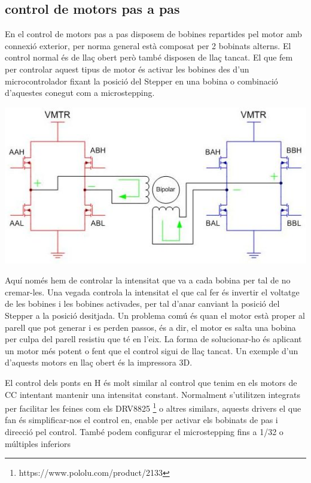 \subsection{control de motors pas a pas }

En el control de motors pas a pas disposem de bobines repartides pel motor amb connexió exterior, per norma general està composat per 2 bobinats alterns. El control normal és de llaç obert però també disposen de llaç tancat. El que fem per controlar aquest tipus de motor és activar les bobines des d'un microcontrolador fixant la posició del Stepper en una bobina o combinació d'aquestes conegut com a microstepping.

\includegraphics[width=\textwidth]{Motors/stepers.jpg}

Aquí només hem de controlar la intensitat que va a cada bobina per tal de no cremar-les. Una vegada controla la intensitat el que cal fer és invertir el voltatge de les bobines i les bobines activades, per tal d'anar canviant la posició del Stepper a la posició desitjada. Un problema comú és quan el motor està proper al parell que pot generar i es perden passos, és a dir, el motor es salta una bobina per culpa del parell resistiu que té en l'eix. La forma de solucionar-ho és aplicant un motor més potent o fent que el control sigui de llaç tancat. Un exemple d'un d'aquests motors en llaç obert és la impressora 3D.

El control dels ponts en H és molt similar al control que tenim en els motors de CC intentant mantenir una intensitat constant. Normalment s'utilitzen integrats per facilitar les feines com els DRV8825 \footnote{https://www.pololu.com/product/2133} o altres similars, aquests drivers el que fan és simplificar-nos el control en, enable per activar els bobinats de pas i direcció pel control. També podem configurar el microstepping fins a 1/32 o múltiples inferiors

